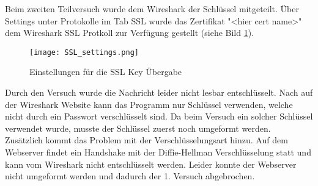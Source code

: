 	Beim zweiten Teilversuch wurde dem Wireshark der Schlüssel mitgeteilt. Über Settings unter Protokolle im Tab SSL wurde das Zertifikat "<hier cert name>" dem Wireshark SSL Protkoll zur Verfügung gestellt (siehe Bild \ref{fig:ssl_settings}).
	\begin{figure}[H]
		\centering
		\texttt{[image: SSL\_settings.png]}
		\caption{Einstellungen für die SSL Key Übergabe}
		\label{fig:ssl_settings}
	\end{figure}
	Durch den Versuch wurde die Nachricht leider nicht lesbar entschlüsselt. Nach  auf der Wireshark Website kann das Programm nur Schlüssel verwenden, welche nicht durch ein Passwort verschlüsselt sind. Da beim Versuch ein solcher Schlüssel verwendet wurde, musste der Schlüssel zuerst noch umgeformt werden.\\
	Zusätzlich kommt das Problem mit der Verschlüsselungsart hinzu. Auf dem Webserver findet ein Handshake mit der Diffie-Hellman Verschlüsselung statt und kann vom Wireshark nicht entschlüsselt werden. Leider konnte der Webserver nicht umgeformt werden und dadurch der 1. Versuch abgebrochen.\\
	
